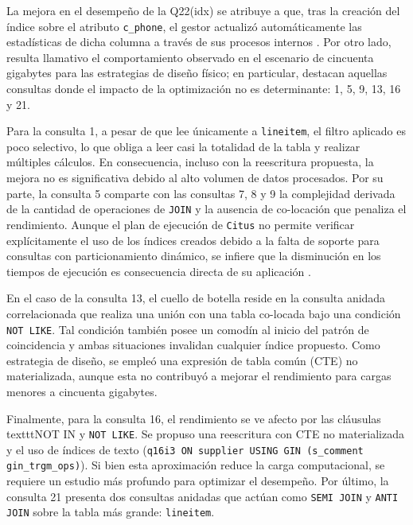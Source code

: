 \documentclass[12pt, letter paper]{report}
\begin{document}
        La mejora en el desempeño de la Q22(idx) se atribuye a que, tras la
        creación del índice sobre el atributo \texttt{c\_phone}, el gestor
        actualizó automáticamente las estadísticas de dicha columna a través de
        sus procesos internos \cite{postgres_autovacuum}. Por otro lado, resulta
        llamativo el comportamiento observado en el escenario de cincuenta
        gigabytes para las estrategias de diseño físico; en particular, destacan
        aquellas consultas donde el impacto de la optimización no es
        determinante: 1, 5, 9, 13, 16 y 21.

        Para la consulta 1, a pesar de que lee únicamente a \texttt{lineitem},
        el filtro aplicado es poco selectivo, lo que obliga a leer casi la
        totalidad de la tabla y realizar múltiples cálculos. En consecuencia,
        incluso con la reescritura propuesta, la mejora no es significativa
        debido al alto volumen de datos procesados. Por su parte, la consulta 5
        comparte con las consultas 7, 8 y 9 la complejidad derivada de la
        cantidad de operaciones de \texttt{JOIN} y la ausencia de co-locación
        que penaliza el rendimiento. Aunque el plan de ejecución de
        \texttt{Citus} no permite verificar explícitamente el uso de los índices
        creados debido a la falta de soporte para consultas con particionamiento
        dinámico, se infiere que la disminución en los tiempos de ejecución es
        consecuencia directa de su aplicación \cite{postgres_autovacuum}.

        En el caso de la consulta 13, el cuello de botella reside en la consulta
        anidada correlacionada que realiza una unión con una tabla co-locada
        bajo una condición \texttt{NOT LIKE}. Tal condición también posee un
        comodín al inicio del patrón de coincidencia y ambas situaciones
        invalidan cualquier índice propuesto. Como estrategia de diseño, se
        empleó una expresión de tabla común (CTE) no materializada, aunque esta
        no contribuyó a mejorar el rendimiento para cargas menores a cincuenta
        gigabytes.

        Finalmente, para la consulta 16, el rendimiento se ve afecto por las
        cláusulas texttt{NOT IN} y \texttt{NOT LIKE}. Se propuso una reescritura
        con CTE no materializada y el uso de índices de texto (\texttt{q16i3 ON
        supplier USING GIN (s\_comment gin\_trgm\_ops)}). Si bien esta
        aproximación reduce la carga computacional, se requiere un estudio más
        profundo para optimizar el desempeño. Por último, la consulta 21
        presenta dos consultas anidadas que actúan como \texttt{SEMI JOIN} y
        \texttt{ANTI JOIN} sobre la tabla más grande: \texttt{lineitem}.
\end{document}
